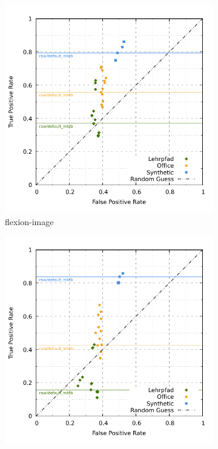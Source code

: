 \begin{figure}[H]
\begin{subfigure}[t]{0.45\linewidth}
    \includegraphics[width=\linewidth]{chapter06/results/AKAZE/flexion/roc.pdf}%
    \caption{\gls{flexion-image}}
\end{subfigure}\quad
\begin{subfigure}[t]{0.45\linewidth}
    \includegraphics[width=\linewidth]{chapter06/results/AKAZE/bearing/roc.pdf}

\end{subfigure}
\end{figure}
